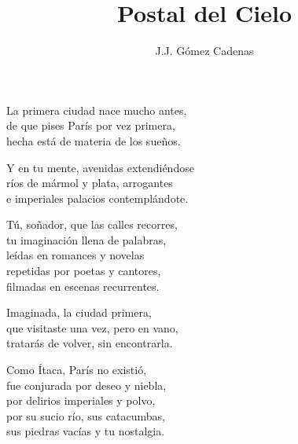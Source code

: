 \documentclass[12pt,twoside]{article}
\title{Postal del Cielo}
\author{J.J. Gómez Cadenas}
\begin{document}
\maketitle

\begin{poem}
\begin{stanza}
La primera ciudad nace mucho antes,\\
de que pises París por vez primera,\\
hecha está de materia de los sueños.
\end{stanza}
\begin{stanza}
Y en tu mente, avenidas extendiéndose\\
ríos de mármol y plata, arrogantes\\
e imperiales palacios contemplándote.
\end{stanza}
\begin{stanza}
Tú, soñador, que las calles recorres,\\
tu imaginación llena de palabras,\\
leídas en romances y novelas\\
repetidas por poetas y cantores,\\
filmadas en escenas recurrentes.
\end{stanza}
\begin{stanza}
Imaginada, la ciudad primera,\\
que visitaste una vez, pero en vano,\\
tratarás de volver, sin encontrarla.
\end{stanza}
\begin{stanza}
Como Ítaca, París no existió,\\
fue conjurada por deseo y niebla,\\
por delirios imperiales y polvo,\\
por su sucio río, sus catacumbas,\\
sus piedras vacías y tu nostalgia.
\end{stanza}
\end{poem}
\end{document}
